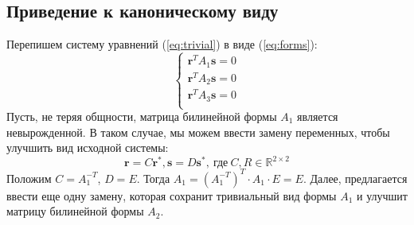 \subsection{Приведение к каноническому виду}
Перепишем систему уравнений (\ref{eq:trivial}) в виде (\ref{eq:forms}):
\begin{equation}
	\begin{cases}
		\mathbf{r}^T A_1 \mathbf{s} = 0 \\
		\mathbf{r}^T A_2 \mathbf{s} = 0 \\
		\mathbf{r}^T A_3 \mathbf{s} = 0 \\						
	\end{cases}
\end{equation}
Пусть, не теряя общности, матрица билинейной формы $A_1$ является невырожденной. В таком случае, 
мы можем ввести замену переменных, чтобы улучшить вид исходной системы:
$$
	\mathbf{r} = C \mathbf{r}^*, \mathbf{s} = D \mathbf{s}^*,~\textrm{где}~C, R \in \mathbb{R}^{2 
	\times 2}  
$$
Положим $C = A_1^{-T}$, $D = E$. Тогда $A_1 = {(A_1^{-T})}^T \cdot A_1 \cdot E = E$. 
Далее, предлагается ввести еще одну замену, которая сохранит тривиальный вид формы $A_1$ и 
улучшит матрицу билинейной формы $A_2$. 


